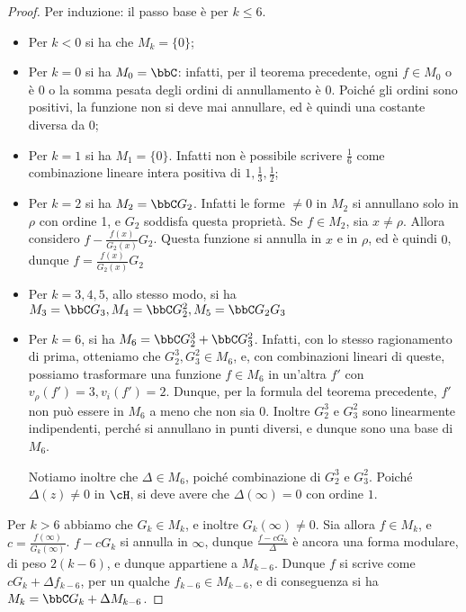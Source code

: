 \begin{proof}
	Per induzione: il passo base è per $k\leq6$.
	\begin{itemize}
		\item Per $k<0$ si ha che $M_k=\{0\}$;
		
		\item Per $k=0$ si ha $M_0=\bbC$: infatti, per il teorema precedente, ogni $f\in M_0$ o è $0$ o la somma pesata degli ordini di annullamento è $0$. Poiché gli ordini sono positivi, la funzione non si deve mai annullare, ed è quindi una costante diversa da $0$;
		
		\item Per $k=1$ si ha $M_1=\{0\}$. Infatti non è possibile scrivere $\frac{1}{6}$ come combinazione lineare intera positiva di $1, \frac{1}{3}, \frac{1}{2}$;
		
		\item Per $k=2$ si ha $M_2=\bbC G_2$. Infatti le forme $\neq0$ in $M_2$ si annullano solo in $\rho$ con ordine 1,
		e $G_2$ soddisfa questa proprietà. Se $f\in M_2$, sia $x\neq\rho$. Allora considero $f-\frac{f(x)}{G_2(x)}G_2$. Questa funzione si annulla in $x$ e in $\rho$, ed è quindi $0$, dunque $f=\frac{f(x)}{G_2(x)}G_2$
		
		\item Per $k=3, 4, 5$, allo stesso modo, si ha $M_3=\bbC G_3, M_4=\bbC G_2^2, M_5= \bbC G_2G_3$
		
		\item Per $k=6$, si ha $M_6=\bbC G_2^3 + \bbC G_3^2$. Infatti, con lo stesso ragionamento di prima, otteniamo che $G_2^3, G_3^2 \in M_6$, e, con combinazioni lineari di queste, possiamo trasformare una funzione $f \in M_6$ in un'altra $f'$ con $v_\rho(f')=3, v_i(f')=2$.
		Dunque, per la formula del teorema precedente, $f'$ non può essere in $M_6$ a meno che non sia $0$.
		Inoltre $G_2^3$ e $G_3^2$ sono linearmente indipendenti, perché si annullano in punti diversi, e dunque sono una base di $M_6$.
		
		Notiamo inoltre che $\Delta\in M_6$, poiché combinazione di $G_2^3$ e $G_3^2$.
		Poiché $\Delta(z)\neq0$ in $\cH$, si deve avere che $\Delta(\infty)=0$ con ordine $1$.
	\end{itemize}
	
	Per $k>6$ abbiamo che $G_k \in M_k$, e inoltre $G_k(\infty)\neq0$.
	Sia allora $f \in M_k$, e $c=\frac{f(\infty)}{G_k(\infty)}$. $f-cG_k$ si annulla in $\infty$, dunque $\frac{f-cG_k}{\Delta}$ è ancora una forma modulare, di peso $2(k-6)$, e dunque appartiene a $M_{k-6}$.
	Dunque $f$ si scrive come $cG_k+\Delta f_{k-6}$, per un qualche $f_{k-6} \in M_{k-6}$, e di conseguenza si ha $M_k=\bbC G_k + \Delta M_{k-6}$.
	

\end{proof}
